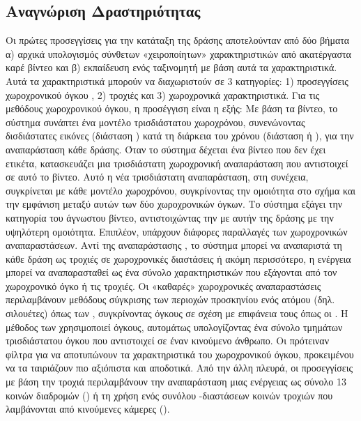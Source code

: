 \subsection{Αναγνώριση Δραστηριότητας}
Οι πρώτες προσεγγίσεις για την κατάταξη της δράσης αποτελούνταν από δύο βήματα α) αρχικά υπολογισμός σύνθετων «χειροποίητων» χαρακτηριστικών από ακατέργαστα καρέ βίντεο
και β) εκπαίδευση ενός ταξινομητή με βάση αυτά τα χαρακτηριστικά. Αυτά τα χαρακτηριστικά μπορούν να διαχωριστούν σε 3 κατηγορίες:
1) προσεγγίσεις χωροχρονικού όγκου , 2) τροχιές  και 3) χωροχρονικά  χαρακτηριστικά. Για τις μεθόδους χωροχρονικού όγκου,
η προσέγγιση είναι η εξής: Με βάση τα  βίντεο, το σύστημα συνάπτει ένα μοντέλο τρισδιάστατου χωροχρόνου, συνενώνοντας δισδιάστατες εικόνες
(διάσταση ) κατά τη διάρκεια του χρόνου (διάσταση  ή ), για την αναπαράσταση κάθε δράσης.
Όταν το σύστημα δέχεται ένα βίντεο που δεν έχει ετικέτα, κατασκευάζει μια τρισδιάστατη χωροχρονική αναπαράσταση που αντιστοιχεί σε αυτό το βίντεο.
Αυτό η νέα τρισδιάστατη αναπαράσταση, στη συνέχεια, συγκρίνεται με κάθε μοντέλο  χωροχρόνου, συγκρίνοντας την ομοιότητα στο σχήμα
και την εμφάνιση μεταξύ αυτών των δύο χωροχρονικών όγκων.
Το σύστημα εξάγει την κατηγορία του άγνωστου βίντεο, αντιστοιχώντας την με αυτήν της δράσης με την υψηλότερη ομοιότητα. Επιπλέον, υπάρχουν
διάφορες παραλλαγές των  χωροχρονικών αναπαραστάσεων. Αντί της αναπαράστασης , το σύστημα μπορεί να αναπαριστά τη κάθε δράση ως τροχιές
σε χωροχρονικές διαστάσεις ή ακόμη περισσότερο, η ενέργεια μπορεί να αναπαρασταθεί ως ένα σύνολο χαρακτηριστικών που εξάγονται από τον χωροχρονικό όγκο ή τις τροχιές.
Οι «καθαρές» χωροχρονικές αναπαραστάσεις περιλαμβάνουν μεθόδους σύγκρισης των περιοχών προσκηνίου ενός ατόμου (δηλ. σιλουέτες) όπως των \en \cite{BobickAaron},\gr
συγκρίνοντας όγκους σε σχέση με επιφάνεια τους όπως οι \en \cite{1467296}\gr. Η μέθοδος των \en \cite{4270510}\gr χρησιμοποιεί  όγκους, αυτομάτως
υπολογίζοντας ένα σύνολο τμημάτων τρισδιάστατου όγκου  που αντιστοιχεί σε έναν κινούμενο άνθρωπο. Οι \en\cite{4587727} \gr πρότειναν φίλτρα για
να αποτυπώνουν τα χαρακτηριστικά του χωροχρονικού όγκου, προκειμένου να τα ταιριάζουν πιο αξιόπιστα και αποδοτικά.
Από την άλλη πλευρά, οι προσεγγίσεις με βάση την τροχιά περιλαμβάνουν την αναπαράσταση μιας ενέργειας ως σύνολο 13 κοινών διαδρομών (\en\cite{1541250}\gr) ή
τη χρήση ενός συνόλου -διαστάσεων κοινών τροχιών που λαμβάνονται από κινούμενες κάμερες  (\en\cite{1541251}\gr).
